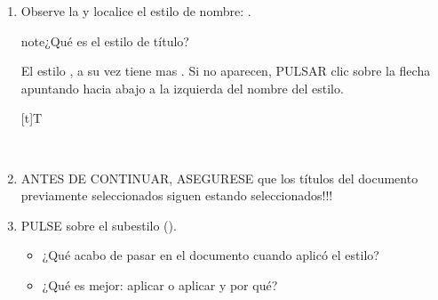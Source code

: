 \documentclass[letterpaper,10pt,spanish]{sphinxmanual}
\let\sphinxpxdimen\pdfpxdimen\else\newdimen\sphinxpxdimen
\begin{document}
\begin{enumerate}
\item {} 
\sphinxAtStartPar
Observe la  y localice el estilo de nombre: .

\begin{sphinxadmonition}{note}{¿Qué es el estilo de título?}

\sphinxAtStartPar
El estilo , a su vez tiene mas . Si no aparecen, PULSAR clic sobre la flecha apuntando hacia abajo a la izquierda del nombre del estilo.
\end{sphinxadmonition}


\begin{savenotes}\sphinxattablestart
\sphinxthistablewithglobalstyle
\centering
\begin{tabulary}{\linewidth}[t]{T}
\sphinxtoprule
\sphinxtableatstartofbodyhook

\begin{sphinxfigure-in-table}
\centering

\noindent\sphinxincludegraphics[width=300\sphinxpxdimen]{{image212}.png}
\end{sphinxfigure-in-table}\relax
\\
\sphinxbottomrule
\end{tabulary}
\sphinxtableafterendhook\par
\sphinxattableend\end{savenotes}

\item {} 
\sphinxAtStartPar
ANTES DE CONTINUAR, ASEGURESE que los títulos del documento previamente seleccionados siguen estando seleccionados!!!

\item {} 
\sphinxAtStartPar
PULSE  sobre el sub\sphinxhyphen{}estilo  (). 
\begin{itemize}
\item {} 
\sphinxAtStartPar
¿Qué acabo de pasar en el documento cuando aplicó el estilo?

\item {} 
\sphinxAtStartPar
¿Qué es mejor: aplicar  o aplicar  y por qué?

\end{itemize}


\end{enumerate}
\end{document}
